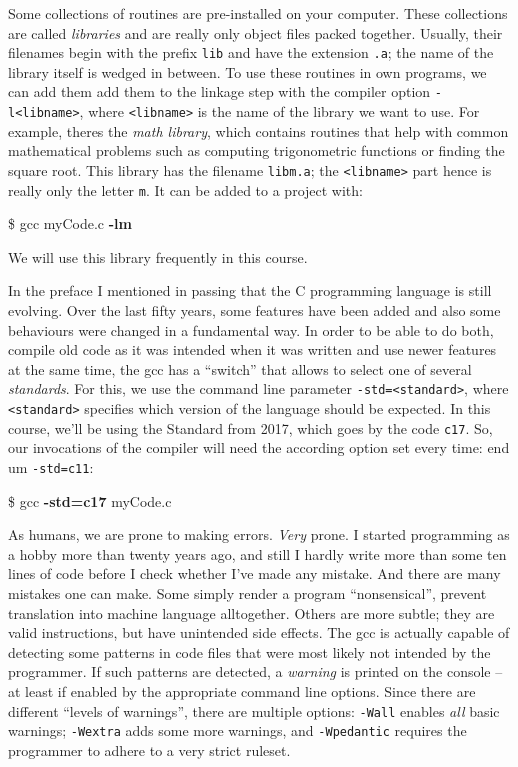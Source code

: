 Some collections of routines are pre-installed on your computer. These collections are called \emph{libraries} and are really only object files packed together. Usually, their filenames begin with the prefix \texttt{lib} and have the extension \texttt{.a}; the name of the library itself is wedged in between. To use these routines in own programs, we can add them add them to the linkage step with the compiler option \texttt{-l<libname>}, where \texttt{<libname>} is the name of the library we want to use. For example, theres the \emph{math library}, which contains routines that help with common mathematical problems such as computing trigonometric functions or finding the square root. This library has the filename \texttt{libm.a}; the \texttt{<libname>} part hence is really only the letter \texttt{m}. It can be added to a project with:
\begin{cmdbox}
\$ gcc myCode.c \textbf{-lm}
\end{cmdbox}
We will use this library frequently in this course.

In the preface I mentioned in passing that the C programming language is still evolving. Over the last fifty years, some features have been added and also some behaviours were changed in a fundamental way. In order to be able to do both, compile old code as it was intended when it was written and use newer features at the same time, the gcc has a \enquote{switch} that allows to select one of several \emph{standards}. For this, we use the command line parameter \texttt{-std=<standard>}, where \texttt{<standard>} specifies which version of the language should be expected. In this course, we'll be using the Standard from 2017, which goes by the code \texttt{c17}. So, our invocations of the compiler will need the according option set every time:
end um \texttt{-std=c11}:
\begin{cmdbox}
\$ gcc \textbf{-std=c17} myCode.c
\end{cmdbox}

As humans, we are prone to making errors. \emph{Very} prone. I started programming as a hobby more than twenty years ago, and still I hardly write more than some ten lines of code before I check whether I've made any mistake. And there are many mistakes one can make. Some simply render a program \enquote{nonsensical}, \ie prevent translation into machine language alltogether. Others are more subtle; they are valid instructions, but have unintended side effects. The gcc is actually capable of detecting some patterns in code files that were most likely not intended by the programmer. If such patterns are detected, a \emph{warning} is printed on the console -- at least if enabled by the appropriate command line options. Since there are different \enquote{levels of warnings}, there are multiple options: \texttt{-Wall} enables \emph{all} basic warnings; \texttt{-Wextra} adds some more warnings, and \texttt{-Wpedantic} requires the programmer to adhere to a very strict ruleset.


